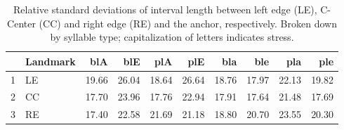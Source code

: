 \begin{table}[ht]
\centering
\begin{tabular}{rlrrrrrrrr}
  \hline
 & Landmark & blA & blE & plA & plE & bla & ble & pla & ple \\ 
  \hline
1 & LE & 19.66 & 26.04 & 18.64 & 26.64 & 18.76 & 17.97 & 22.13 & 19.82 \\ 
  2 & CC & 17.70 & 23.96 & 17.76 & 22.94 & 17.91 & 17.64 & 21.48 & 17.69 \\ 
  3 & RE & 17.40 & 22.58 & 21.69 & 21.18 & 18.80 & 20.70 & 23.55 & 20.30 \\ 
   \hline
\end{tabular}
\caption{Relative standard deviations of interval length between left edge (LE), C-Center (CC) and right edge (RE) and the anchor, respectively. Broken down by syllable type; capitalization of letters indicates stress.\label{tab:all_pairs}} 
\end{table}
